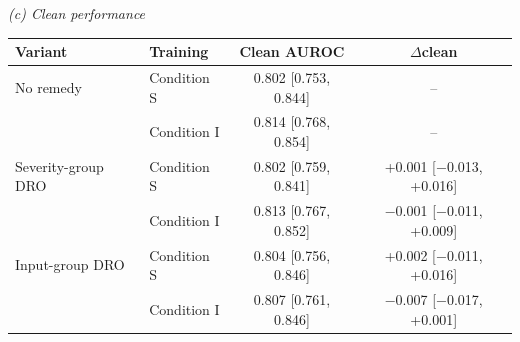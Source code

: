 \medskip
\textit{(c) Clean performance}\\[2pt]
\begin{tabular}{@{}llcc@{}}
\toprule
Variant & Training & Clean AUROC & $\Delta$clean \\
\midrule
No remedy & Condition S & 0.802 [0.753, 0.844] & -- \\
 & Condition I & 0.814 [0.768, 0.854] & -- \\
\addlinespace
Severity-group DRO & Condition S & 0.802 [0.759, 0.841] & +0.001 [$-$0.013, +0.016] \\
 & Condition I & 0.813 [0.767, 0.852] & $-$0.001 [$-$0.011, +0.009] \\
\addlinespace
Input-group DRO & Condition S & 0.804 [0.756, 0.846] & +0.002 [$-$0.011, +0.016] \\
 & Condition I & 0.807 [0.761, 0.846] & $-$0.007 [$-$0.017, +0.001] \\
\bottomrule
\end{tabular}
